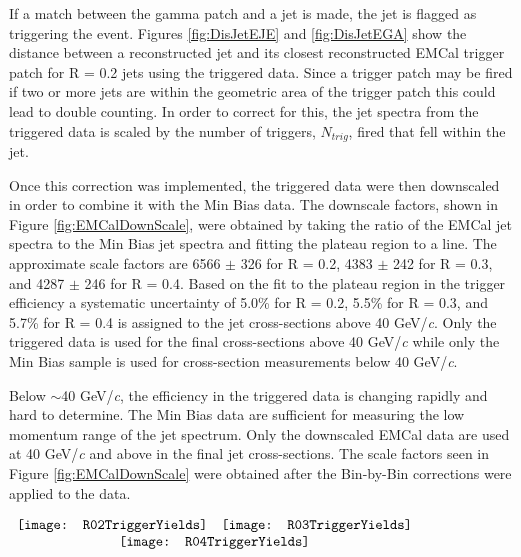 \noindent
If a match between the gamma patch and a jet is made, the jet is flagged as triggering the event.  Figures \ref{fig:DisJetEJE} and \ref{fig:DisJetEGA} show the distance between a reconstructed jet and its closest reconstructed EMCal trigger patch for R = 0.2 jets using the triggered data.  Since a trigger patch may be fired if two or more jets are within the geometric area of the trigger patch this could lead to double counting.  In order to correct for this, the jet spectra from the triggered data is scaled by the number of triggers, $N_{trig}$, fired that fell within the jet.  

Once this correction was implemented, the triggered data were then downscaled in order to combine it with the Min Bias data.  The downscale factors, shown in Figure \ref{fig:EMCalDownScale}, were obtained by taking the ratio of the EMCal jet spectra to the Min Bias jet spectra and fitting the plateau region to a line.  The approximate scale factors are 6566 $\pm$ 326 for R = 0.2, 4383 $\pm$ 242 for R = 0.3, and 4287 $\pm$ 246 for R = 0.4.  Based on the fit to the plateau region in the trigger efficiency a systematic uncertainty of 5.0\% for R = 0.2, 5.5\% for R = 0.3, and 5.7\% for R = 0.4 is assigned to the jet cross-sections above 40 GeV/\textit{c}.  Only the triggered data is used for the final cross-sections above 40 GeV/\textit{c} while only the Min Bias sample is used for cross-section measurements below 40 GeV/\textit{c}.

Below $\sim$40 GeV/\textit{c}, the efficiency in the triggered data is changing rapidly and hard to determine.  The Min Bias data are sufficient for measuring the low momentum range of the jet spectrum.  Only the downscaled EMCal data are used at 40 GeV/\textit{c} and above in the final jet cross-sections.  The scale factors seen in Figure \ref{fig:EMCalDownScale} were obtained after the Bin-by-Bin corrections were applied to the data.


\begin{figure*}[t!]
$\begin{array}{rl}
    \texttt{[image: R02TriggerYields]} &
    \texttt{[image: R03TriggerYields]}\\
    \multicolumn{2}{c}{\texttt{[image: R04TriggerYields]}}
\end{array}$
\caption[EMCal triggered data correction factors for R=0.2, R=0.3, and R=0.4 jets.]{\label{fig:EMCalDownScale}EMCal triggered data correction factors for R=0.2, R=0.3, and R=0.4 jets.}
\end{figure*}
 

